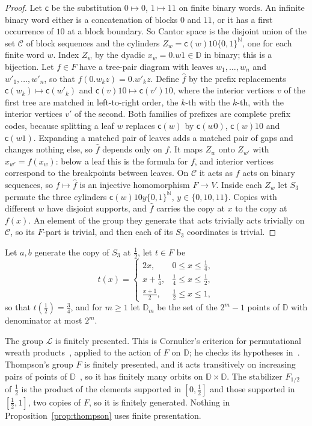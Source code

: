 \begin{proof}
Let $\mathsf c$ be the substitution $0\mapsto0$, $1\mapsto11$ on finite binary words. An infinite binary word either is a concatenation of
blocks $0$ and $11$, or it has a first occurrence of $10$ at a block boundary. So Cantor space is the disjoint union of the set $\mathcal C$ of
block sequences and the cylinders $Z_w=\mathsf c(w)10\{0,1\}^{\mathbb N}$, one for each finite word $w$. Index $Z_w$ by the dyadic
$x_w=0.w1\in\mathbb D$ in binary; this is a bijection. Let $f\in F$ have a tree-pair diagram with leaves $w_1,\dots,w_n$ and $w'_1,\dots,w'_n$,
so that $f(0.w_kz)=0.w'_kz$. Define $\hat f$ by the prefix replacements $\mathsf c(w_k)\mapsto\mathsf c(w'_k)$ and
$\mathsf c(v)10\mapsto\mathsf c(v')10$, where the interior vertices $v$ of the first tree are matched in left-to-right order, the $k$-th with the $k$-th, with the interior vertices $v'$ of
the second. Both families of prefixes are complete prefix codes, because splitting a leaf $w$ replaces $\mathsf c(w)$ by $\mathsf c(w0)$,
$\mathsf c(w)10$ and $\mathsf c(w1)$. Expanding a matched pair of leaves adds a matched pair of gaps and changes nothing else, so $\hat f$ depends
only on $f$. It maps $Z_w$ onto $Z_{w'}$ with $x_{w'}=f(x_w)$: below a leaf this is the formula for $f$, and interior vertices correspond to the
breakpoints between leaves. On $\mathcal C$ it acts as $f$ acts on binary sequences, so $f\mapsto\hat f$ is an injective homomorphism $F\to V$.
Inside each $Z_w$ let $S_3$ permute the three cylinders $\mathsf c(w)10y\{0,1\}^{\mathbb N}$, $y\in\{0,10,11\}$. Copies with different $w$ have
disjoint supports, and $\hat f$ carries the copy at $x$ to the copy at $f(x)$. An element of the group they generate that acts trivially acts
trivially on $\mathcal C$, so its $F$-part is trivial, and then each of its $S_3$ coordinates is trivial.
\end{proof}

Let $a,b$ generate the copy of $S_3$ at $\frac12$, let $t\in F$ be
\[
t(x)=\begin{cases}2x,&0\le x\le\frac14,\\ x+\frac14,&\frac14\le x\le\frac12,\\ \frac{x+1}2,&\frac12\le x\le1,\end{cases}
\]
so that $t(\frac12)=\frac34$, and for $m\ge1$ let $\mathbb D_m$ be the set of the $2^m-1$ points of $\mathbb D$ with denominator at most
$2^m$.

The group $\mathcal L$ is finitely presented. This is Cornulier's criterion for permutational wreath products~\cite[Theorem~1.1]{Cornulier2006},
applied to the action of $F$ on $\mathbb D$; he checks its hypotheses in~\cite[Example~3.4]{Cornulier2006}. Thompson's group $F$ is finitely
presented, and it acts transitively on increasing pairs of points of $\mathbb D$~\cite[Lemma~4.2]{CFP1996}, so it has finitely many orbits on
$\mathbb D\times\mathbb D$. The stabilizer $F_{1/2}$ of $\frac12$ is the product of the elements supported in $[0,\frac12]$ and those supported
in $[\frac12,1]$, two copies of $F$, so it is finitely generated. Nothing in Proposition~\ref{prop:thompson} uses finite presentation.

